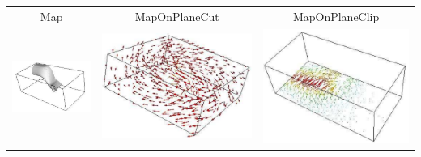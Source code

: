 \begin{table}[ht]
\begin{tabular}{c c c}
Map & MapOnPlaneCut & MapOnPlaneClip \\
\includegraphics[width=\thumbnailwidth]{figures/MapOnScalarClip} & 
\includegraphics[width=\thumbnailwidth]{figures/Velocity} & 
\includegraphics[width=\thumbnailwidth]{figures/VelocityOnPlaneCut}  \\

\end{tabular}
\end{table}
